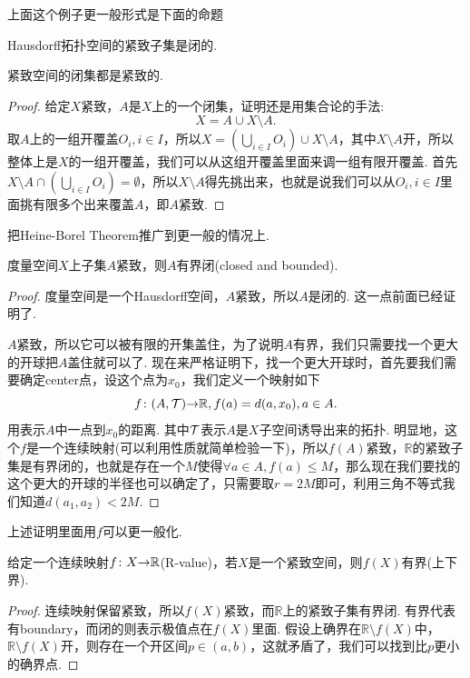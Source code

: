 上面这个例子更一般形式是下面的命题
\begin{proposition}
\rm Hausdorff拓扑空间的紧致子集是闭的.
\end{proposition}

\begin{proposition}
紧致空间的闭集都是紧致的.
\end{proposition}

\begin{proof}
给定$X$紧致，$A$是$X$上的一个闭集，证明还是用集合论的手法:\[X = A \cup X \setminus A.\]取$A$上的一组开覆盖$O_i,i \in I$，所以$X = \left( \bigcup\limits_{i \in I} O_i \right) \cup X \setminus A$，其中$X \setminus A$开，所以整体上是$X$的一组开覆盖，我们可以从这组开覆盖里面来调一组有限开覆盖. 首先$X \setminus A \cap \left( \bigcup\limits_{i \in I} O_i \right)= \emptyset$，所以$X \setminus A$得先挑出来，也就是说我们可以从$O_i,i \in I$里面挑有限多个出来覆盖$A$，即$A$紧致.
\end{proof}

把Heine-Borel Theorem推广到更一般的情况上.
\begin{proposition}
\rm 度量空间$X$上子集$A$紧致，则$A$有界闭(closed and bounded).
\end{proposition}

\begin{proof}
度量空间是一个Hausdorff空间，$A$紧致，所以$A$是闭的. 这一点前面已经证明了.

$A$紧致，所以它可以被有限的开集盖住，为了说明$A$有界，我们只需要找一个更大的开球把$A$盖住就可以了. 现在来严格证明下，找一个更大开球时，首先要我们需要确定center点，设这个点为$x_0$，我们定义一个映射如下\[{f}\colon{(A,\mathcal{T})}{\to}{\mathbb{R}}, f(a) = d(a,x_0), a \in A.\]用表示$A$中一点到$x_0$的距离. 其中$\mathcal{T}$表示$A$是$X$子空间诱导出来的拓扑. 明显地，这个$f$是一个连续映射(可以利用性质就简单检验一下)，所以$f(A)$紧致，$\mathbb{R}$的紧致子集是有界闭的，也就是存在一个$M$使得$\forall a \in A, f(a) \leq M$，那么现在我们要找的这个更大的开球的半径也可以确定了，只需要取$r = 2M$即可，利用三角不等式我们知道$d(a_1,a_2)<2M$.  
\end{proof}

上述证明里面用$f$可以更一般化.

\begin{lemma}
给定一个连续映射${f}\colon{X}{\to}{\mathbb{R}}$(R-value)，若$X$是一个紧致空间，则$f(X)$有界(上下界).
\end{lemma}

\begin{proof}
连续映射保留紧致，所以$f(X)$紧致，而$\mathbb{R}$上的紧致子集有界闭. 有界代表有boundary，而闭的则表示极值点在$f(X)$里面. 假设上确界在$\mathbb{R} \setminus f(X)$中，$\mathbb{R} \setminus f(X)$开，则存在一个开区间$p \in (a,b)$，这就矛盾了，我们可以找到比$p$更小的确界点.
\end{proof}


